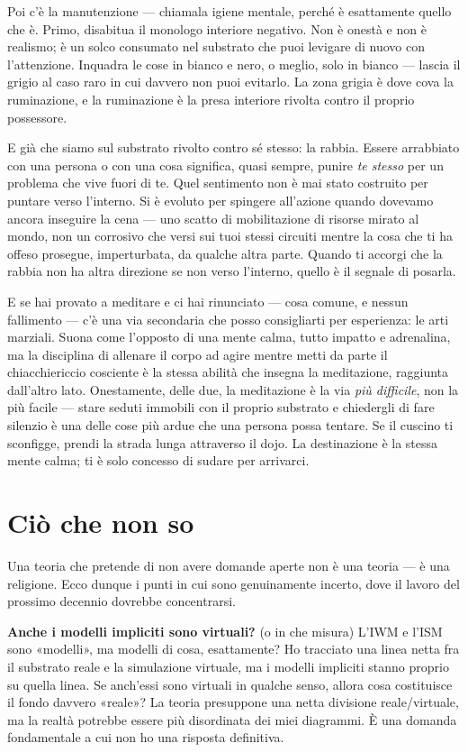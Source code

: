 \documentclass[11pt, twoside, openright]{book}
\begin{document}
Poi c'è la manutenzione --- chiamala igiene mentale, perché è esattamente quello che è. Primo, disabitua il monologo interiore negativo. Non è onestà e non è realismo; è un solco consumato nel substrato che puoi levigare di nuovo con l'attenzione. Inquadra le cose in bianco e nero, o meglio, solo in bianco --- lascia il grigio al caso raro in cui davvero non puoi evitarlo. La zona grigia è dove cova la ruminazione, e la ruminazione è la presa interiore rivolta contro il proprio possessore.

E già che siamo sul substrato rivolto contro sé stesso: la rabbia. Essere arrabbiato con una persona o con una cosa significa, quasi sempre, punire \textit{te stesso} per un problema che vive fuori di te. Quel sentimento non è mai stato costruito per puntare verso l'interno. Si è evoluto per spingere all'azione quando dovevamo ancora inseguire la cena --- uno scatto di mobilitazione di risorse mirato al mondo, non un corrosivo che versi sui tuoi stessi circuiti mentre la cosa che ti ha offeso prosegue, imperturbata, da qualche altra parte. Quando ti accorgi che la rabbia non ha altra direzione se non verso l'interno, quello è il segnale di posarla.

E se hai provato a meditare e ci hai rinunciato --- cosa comune, e nessun fallimento --- c'è una via secondaria che posso consigliarti per esperienza: le arti marziali. Suona come l'opposto di una mente calma, tutto impatto e adrenalina, ma la disciplina di allenare il corpo ad agire mentre metti da parte il chiacchiericcio cosciente è la stessa abilità che insegna la meditazione, raggiunta dall'altro lato. Onestamente, delle due, la meditazione è la via \textit{più difficile}, non la più facile --- stare seduti immobili con il proprio substrato e chiedergli di fare silenzio è una delle cose più ardue che una persona possa tentare. Se il cuscino ti sconfigge, prendi la strada lunga attraverso il dojo. La destinazione è la stessa mente calma; ti è solo concesso di sudare per arrivarci.

\section*{Ciò che non so}

Una teoria che pretende di non avere domande aperte non è una teoria --- è una religione. Ecco dunque i punti in cui sono genuinamente incerto, dove il lavoro del prossimo decennio dovrebbe concentrarsi.

\textbf{Anche i modelli impliciti sono virtuali?} (o in che misura) L'IWM e l'ISM sono «modelli», ma modelli di cosa, esattamente? Ho tracciato una linea netta fra il substrato reale e la simulazione virtuale, ma i modelli impliciti stanno proprio su quella linea. Se anch'essi sono virtuali in qualche senso, allora cosa costituisce il fondo davvero «reale»? La teoria presuppone una netta divisione reale/\allowbreak{}virtuale, ma la realtà potrebbe essere più disordinata dei miei diagrammi. È una domanda fondamentale a cui non ho una risposta definitiva.
\end{document}
